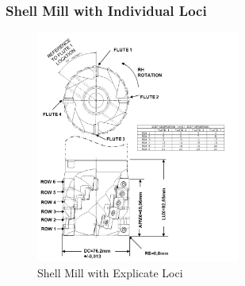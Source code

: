 \documentclass{mtconnect}	%
\begin{document}
\pagebreak

\subsubsection{Shell Mill with Individual Loci}

\begin{figure}[ht]
  \centering
  \includegraphics[width=0.6\textwidth]{figures/a10-shell-mill-with-explicate-loci.png}
  \caption{Shell Mill with Explicate Loci}
  \label{fig:a10-shell-mill-with-explicate-loci}
\end{figure}
\FloatBarrier
\end{document}
